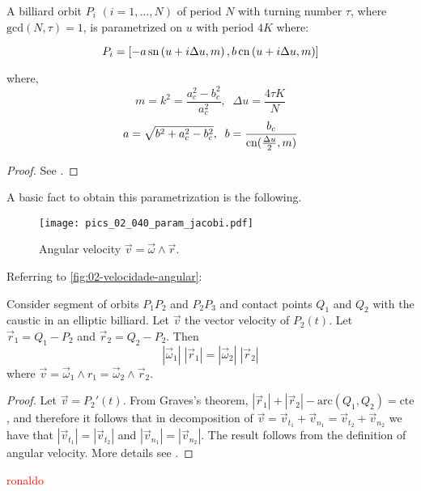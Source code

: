 \begin{theorem}
A billiard orbit $P_i$ $(i=1,\ldots, N) $ of period $N$  with turning number $\tau$, where $\mathrm{gcd}(N,\tau) =1$,  is parametrized on $u$ with period $4K$ where:


\[ 
P_i=
\left[-a\,\mathrm{sn}  \left(u+ i \Delta{u},  {m} \right) , b\,\mathrm{cn}  \left(u + i \Delta{u}, { m} \right)\right]
\]

where,
\[ m=k^2=\frac{a_c^2-b_c^2}{a_c^2},\;\;\Delta{u}=\frac{4\tau K}{N}\]
\[a= \sqrt{b^2+ a_c^2-b_c^2}, \;\; b=\frac{b_c}{\mathrm{cn}(\frac{\Delta{u}}{2}, m)}\]
\end{theorem}
\begin{proof} See \cite{stachel2021-billiards}.\end{proof}

A basic fact to obtain this parametrization is the following.

\begin{figure}
    \centering
    \texttt{[image: pics\_02\_040\_param\_jacobi.pdf]}
    \caption{ Angular velocity $\vec v=\vec \omega\wedge \vec r$. } 
    \end{figure}
Referring to \cref{fig:02-velocidade-angular}:

\begin{proposition} 
Consider   segment of orbits $P_1P_2$ and $P_2P_3$  and contact points $Q_1$ and $Q_2$ with the caustic in an elliptic billiard. Let $\vec v$ the vector velocity of $P_2(t)$. Let $\vec r_1=Q_1-P_2$ and $\vec r_2=Q_2-P_2$. Then
\[ |\vec \omega_1|\;|\vec r_1|=|\vec \omega_2|\; |\vec r_2|\]
where $\vec v=\vec\omega_1\wedge r_1= \vec\omega_2\wedge \vec r_2$.

\label{fig:02-velocidade-angular}
\end{proposition}

\begin{proof} Let $\vec v=P_2'(t)$. From Graves's theorem, $|\vec r_1|+|\vec r_2|-\text{arc}(Q_1,Q_2)=\text{cte}$,  and therefore it follows that in decomposition of $\vec v=\vec v_{t_1}+\vec v_{n_1}=\vec v_{t_2}+\vec v_{n_2}$ we have that $|\vec v_{t_1}|=|\vec v_{t_2}|$ and  $|\vec v_{n_1}|=|\vec v_{n_2}|$. The result follows from the   definition of angular velocity. More details see \cite{stachel2021-billiards-param}.
\end{proof}
 
\textcolor{red}{ronaldo}
 
